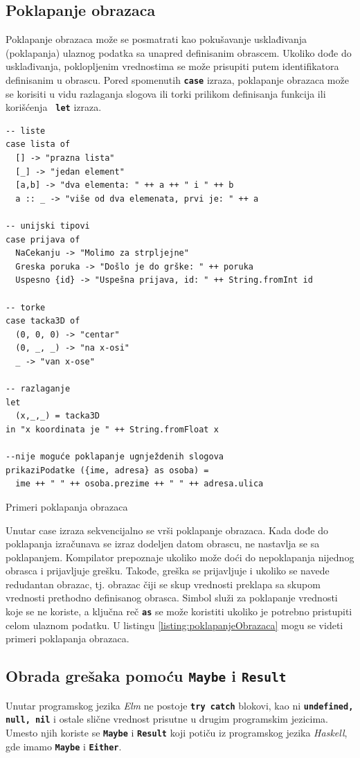 \documentclass[12pt,oneside]{memoir}
\begin{document}
\subsection{Poklapanje obrazaca}
Poklapanje obrazaca može se posmatrati kao pokušavanje usklađivanja (poklapanja) ulaznog
podatka sa unapred definisanim obrascem. Ukoliko dođe do usklađivanja, poklopljenim
vrednostima se može prisupiti putem identifikatora definisanim u obrascu. Pored spomenutih
\texttt{\textbf{case}} izraza, poklapanje obrazaca može se korisiti u vidu 
razlaganja slogova ili torki prilikom definisanja funkcija ili korišćenja \texttt{\textbf{
let}} izraza.
\begin{listing}[h]
\begin{verbatim}
-- liste 
case lista of
  [] -> "prazna lista"
  [_] -> "jedan element"
  [a,b] -> "dva elementa: " ++ a ++ " i " ++ b
  a :: _ -> "više od dva elemenata, prvi je: " ++ a

-- unijski tipovi
case prijava of
  NaCekanju -> "Molimo za strpljejne"
  Greska poruka -> "Došlo je do grške: " ++ poruka
  Uspesno {id} -> "Uspešna prijava, id: " ++ String.fromInt id

-- torke
case tacka3D of
  (0, 0, 0) -> "centar"
  (0, _, _) -> "na x-osi"
  _ -> "van x-ose"

-- razlaganje
let
  (x,_,_) = tacka3D
in "x koordinata je " ++ String.fromFloat x

--nije moguće poklapanje ugnježdenih slogova
prikaziPodatke ({ime, adresa} as osoba) =
  ime ++ " " ++ osoba.prezime ++ " " ++ adresa.ulica
\end{verbatim}
\caption{Primeri poklapanja obrazaca}
\label{listing:poklapanjeObrazaca}
\end{listing}

Unutar case izraza sekvencijalno se vrši poklapanje obrazaca. Kada dođe do poklapanja
izračunava se izraz dodeljen datom obrascu, ne nastavlja se sa poklapanjem. Kompilator
prepoznaje ukoliko može doći do nepoklapanja nijednog obrasca i prijavljuje grešku.
Takođe, greška se prijavljuje i ukoliko se navede redudantan obrazac, tj. obrazac čiji se
skup vrednosti preklapa sa skupom vrednosti prethodno definisanog obrasca.
Simbol \texttt{\textbf{\textunderscore}} služi za poklapanje vrednosti koje se ne koriste,
a ključna reč \texttt{\textbf{as}} se može koristiti ukoliko je potrebno pristupiti celom
ulaznom podatku. U listingu \ref{listing:poklapanjeObrazaca} mogu se videti primeri
poklapanja obrazaca.

\subsection{Obrada grešaka pomoću \texttt{\textbf{Maybe}} i \texttt{\textbf{Result}}}
Unutar programskog jezika \emph{Elm} ne postoje \texttt{\textbf{try catch}} blokovi, kao ni \texttt{\textbf{undefined, null, nil}}
i ostale slične vrednost prisutne u drugim programskim jezicima.
Umesto njih koriste se \texttt{\textbf{Maybe}} i \texttt{\textbf{Result}} koji potiču iz programskog jezika \emph{Haskell},
gde imamo \texttt{\textbf{Maybe}} i \texttt{\textbf{Either}}.
\end{document}

